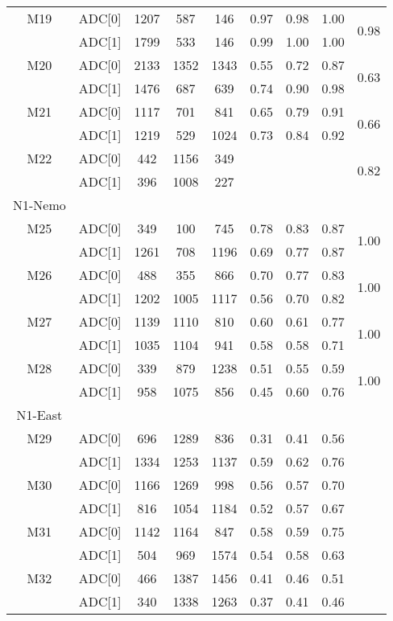 \begin{longtable}{c c c c c c c c c}
  M19 & ADC[0] & 1207 & 587 & 146 & 0.97 & 0.98 & 1.00 & \multirow{2}{*}{0.98}\\
      & ADC[1] & 1799 & 533 & 146 & 0.99 & 1.00 & 1.00 & \\
  M20 & ADC[0] & 2133 & 1352 & 1343 & 0.55 & 0.72 & 0.87 & \multirow{2}{*}{0.63}\\
      & ADC[1] & 1476 & 687 & 639 & 0.74 & 0.90 & 0.98 & \\
  M21 & ADC[0] & 1117 & 701 & 841 & 0.65 & 0.79 & 0.91 & \multirow{2}{*}{0.66}\\
      & ADC[1] & 1219 & 529 & 1024 & 0.73 & 0.84 & 0.92 & \\
  M22 & ADC[0] & 442 & 1156 & 349 &   &   &   & \multirow{2}{*}{0.82}\\
      & ADC[1] & 396 & 1008 & 227 &   &   &   & \\
  \midrule
  N1-Nemo\\
  \midrule
  M25 & ADC[0] & 349 & 100 & 745 & 0.78 & 0.83 & 0.87 & \multirow{2}{*}{1.00} \\
      & ADC[1] & 1261 & 708 & 1196 & 0.69 & 0.77 & 0.87 & \\
  M26 & ADC[0] & 488 & 355 & 866 & 0.70 & 0.77 & 0.83 & \multirow{2}{*}{1.00} \\
      & ADC[1] & 1202 & 1005 & 1117 & 0.56 & 0.70 & 0.82 & \\
  M27 & ADC[0] & 1139 & 1110 & 810 & 0.60 & 0.61 & 0.77 & \multirow{2}{*}{1.00} \\
      & ADC[1] & 1035 & 1104 & 941 & 0.58 & 0.58 & 0.71 & \\
  M28 & ADC[0] & 339 & 879 & 1238 & 0.51 & 0.55 & 0.59 & \multirow{2}{*}{1.00} \\
      & ADC[1] & 958 & 1075 & 856 & 0.45 & 0.60 & 0.76 & \\
  \midrule
  N1-East\\
  \midrule
  M29 & ADC[0] & 696 & 1289 & 836 & 0.31 & 0.41 & 0.56\\
      & ADC[1] & 1334 & 1253 & 1137 & 0.59 & 0.62 & 0.76\\
  M30 & ADC[0] & 1166 & 1269 & 998 & 0.56 & 0.57 & 0.70\\
      & ADC[1] & 816 & 1054 & 1184 & 0.52 & 0.57 & 0.67\\
  M31 & ADC[0] & 1142 & 1164 & 847 & 0.58 & 0.59 & 0.75\\
      & ADC[1] & 504 & 969 & 1574 & 0.54 & 0.58 & 0.63\\
  M32 & ADC[0] & 466 & 1387 & 1456 & 0.41 & 0.46 & 0.51\\
      & ADC[1] & 340 & 1338 & 1263 & 0.37 & 0.41 & 0.46\\

\end{longtable}

